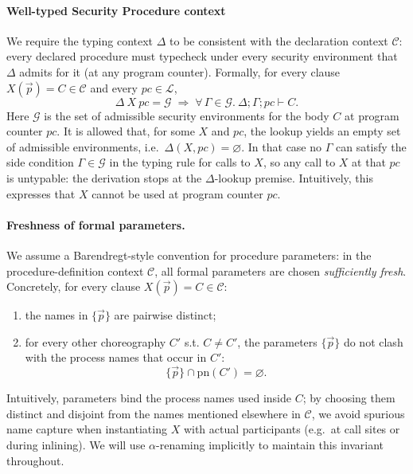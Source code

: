 \documentclass[12pt,a4paper,twoside]{book}
\newcommand{\pn}{\mathrm{pn}}
\begin{document}
\paragraph{Well-typed Security Procedure context}
We require the typing context \(\Delta\) to be consistent with the declaration context \(\mathscr{C}\): every declared procedure must typecheck under every security environment that \(\Delta\) admits for it (at any program counter). Formally, for every clause \(X(\vec{p}) = C \in \mathscr{C}\) and every \(pc \in \mathscr{L}\),
\[
  \Delta~X~pc = \mathcal{G}
  \;\Longrightarrow\;
  \forall\,\Gamma \in \mathcal{G}.\ \Delta;\Gamma;pc \vdash C.
\]
Here \(\mathcal{G}\) is the set of admissible security environments for the body \(C\) at program counter \(pc\).
It is allowed that, for some \(X\) and \(pc\), the lookup yields an empty set of admissible environments, i.e.\ \(\Delta(X,pc)=\varnothing\).
In that case no \(\Gamma\) can satisfy the side condition \(\Gamma \in \mathcal{G}\) in the typing rule for calls to \(X\), so any call to \(X\) at that \(pc\) is untypable: the derivation stops at the \(\Delta\)-lookup premise. Intuitively, this expresses that \(X\) cannot be used at program counter \(pc\).

\paragraph{Freshness of formal parameters.}
\label{ass:fresh}
We assume a Barendregt-style convention for procedure parameters\cite{barendregt1984lambda}: in the procedure-definition context \(\mathscr{C}\), all formal parameters are chosen \emph{sufficiently fresh}. Concretely, for every clause \(X(\vec{p}) = C \in \mathscr{C}\):
\begin{enumerate}
  \item the names in \(\{\vec{p}\}\) are pairwise distinct;
  \item for every other choreography $C'$ s.t. \(C \neq C'\), the parameters \(\{\vec{p}\}\) do not clash with the process names that occur in \(C'\):
  \[
    \{\vec{p}\} \cap \pn(C') = \varnothing.
  \]
\end{enumerate}
Intuitively, parameters bind the process names used inside \(C\); by choosing them distinct and disjoint from the names mentioned elsewhere in \(\mathscr{C}\), we avoid spurious name capture when instantiating \(X\) with actual participants (e.g.\ at call sites or during inlining). We will use \(\alpha\)-renaming implicitly to maintain this invariant throughout.
\end{document}
